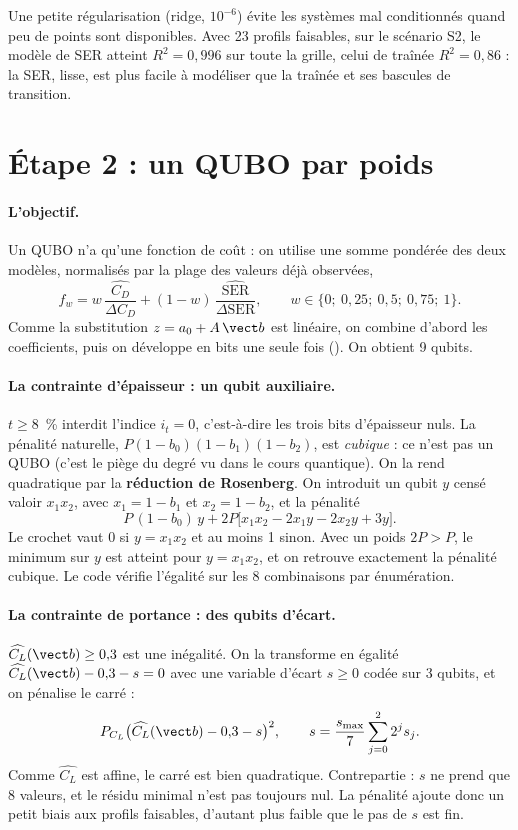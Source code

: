 Une petite régularisation (ridge, $10^{-6}$) évite les systèmes mal conditionnés quand peu de points sont disponibles. Avec 23 profils faisables, sur le scénario S2, le modèle de SER atteint $R^2=0{,}996$ sur toute la grille, celui de traînée $R^2=0{,}86$ : la SER, lisse, est plus facile à modéliser que la traînée et ses bascules de transition.

\section{Étape 2 : un QUBO par poids}
\paragraph{L'objectif.} Un QUBO n'a qu'une fonction de coût : on utilise une somme pondérée des deux modèles, normalisés par la plage des valeurs déjà observées,
\[
f_w=w\,\frac{\widehat{C_D}}{\Delta C_D}+(1-w)\,\frac{\widehat{\mathrm{SER}}}{\Delta\mathrm{SER}},\qquad w\in\{0;\ 0{,}25;\ 0{,}5;\ 0{,}75;\ 1\}.
\]
Comme la substitution $z=a_0+A\,\vect b$ est linéaire, on combine d'abord les coefficients, puis on développe en bits une seule fois (). On obtient 9 qubits.

\paragraph{La contrainte d'épaisseur : un qubit auxiliaire.} $t\ge8$~\% interdit l'indice $i_t=0$, c'est-à-dire les trois bits d'épaisseur nuls. La pénalité naturelle, $P(1-b_0)(1-b_1)(1-b_2)$, est \emph{cubique} : ce n'est pas un QUBO (c'est le piège du degré vu dans le cours quantique). On la rend quadratique par la \textbf{réduction de Rosenberg}. On introduit un qubit $y$ censé valoir $x_1x_2$, avec $x_1=1-b_1$ et $x_2=1-b_2$, et la pénalité
\[
P\,(1-b_0)\,y+2P\big[x_1x_2-2x_1y-2x_2y+3y\big].
\]
Le crochet vaut 0 si $y=x_1x_2$ et au moins 1 sinon. Avec un poids $2P>P$, le minimum sur $y$ est atteint pour $y=x_1x_2$, et on retrouve exactement la pénalité cubique. Le code vérifie l'égalité sur les 8 combinaisons par énumération.

\paragraph{La contrainte de portance : des qubits d'écart.} $\widehat{C_L}(\vect b)\ge0{,}3$ est une inégalité. On la transforme en égalité $\widehat{C_L}(\vect b)-0{,}3-s=0$ avec une variable d'écart $s\ge0$ codée sur 3 qubits, et on pénalise le carré :
\[
P_{C_L}\big(\widehat{C_L}(\vect b)-0{,}3-s\big)^2,\qquad s=\frac{s_{\max}}{7}\sum_{j=0}^{2}2^js_j .
\]
Comme $\widehat{C_L}$ est affine, le carré est bien quadratique. Contrepartie : $s$ ne prend que 8 valeurs, et le résidu minimal n'est pas toujours nul. La pénalité ajoute donc un petit biais aux profils faisables, d'autant plus faible que le pas de $s$ est fin.

